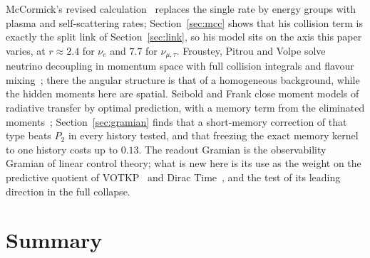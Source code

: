 \documentclass[11pt]{article}
\begin{document}
McCormick's revised calculation~\cite{McC2} replaces the single rate by energy groups with plasma and self-scattering rates; Section~\ref{sec:mcc} shows that his collision term is exactly the split link of Section~\ref{sec:link}, so his model sits on the axis this paper varies, at $r\approx2.4$ for $\nu_e$ and $7.7$ for $\nu_{\mu,\tau}$. Froustey, Pitrou and Volpe solve neutrino decoupling in momentum space with full collision integrals and flavour mixing~\cite{FPV}; there the angular structure is that of a homogeneous background, while the hidden moments here are spatial. Seibold and Frank close moment models of radiative transfer by optimal prediction, with a memory term from the eliminated moments~\cite{SF}; Section~\ref{sec:gramian} finds that a short-memory correction of that type beats $P_2$ in every history tested, and that freezing the exact memory kernel to one history costs up to $0.13$. The readout Gramian is the observability Gramian of linear control theory; what is new here is its use as the weight on the predictive quotient of VOTKP~\cite{VOTKP} and Dirac Time~\cite{DT}, and the test of its leading direction in the full collapse.

\section{Summary}
\end{document}
